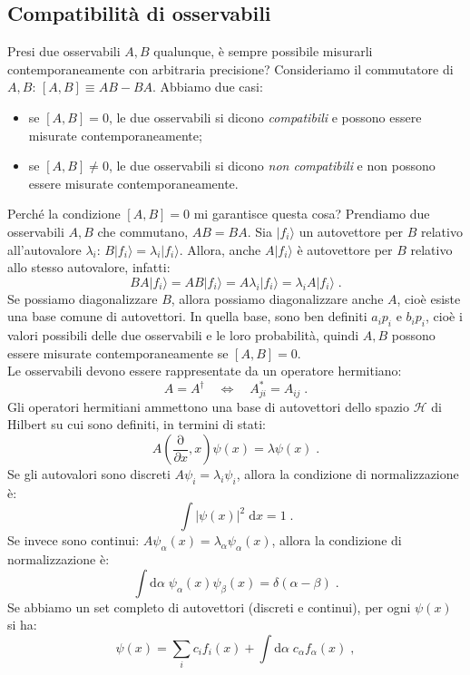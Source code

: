 \documentclass[12pt,a4paper]{report}
\theoremstyle{definition}
\newcommand{\ham}{\mathcal{H}}
\numberwithin{equation}{section}
\newcommand{\diff}[1][]{\mathrm{d}#1}
\newcommand{\ket}{\rangle}
\begin{document}
\subsection{Compatibilità di osservabili}
Presi due osservabili $A,B$ qualunque, è sempre possibile misurarli contemporaneamente con arbitraria precisione? Consideriamo il commutatore di $A,B$: $[A,B]\equiv AB-BA$. Abbiamo due casi:
\begin{itemize}
\item se $[A,B]=0$, le due osservabili si dicono \textit{compatibili} e possono essere misurate contemporaneamente;
\item se $[A,B]\ne0$, le due osservabili si dicono \textit{non compatibili} e non possono essere misurate contemporaneamente.
\end{itemize}
Perché la condizione $[A,B]=0$ mi garantisce questa cosa? Prendiamo due osservabili $A,B$ che commutano, $AB=BA$. Sia $|f_i\ket$ un autovettore per $B$ relativo all'autovalore $\lambda_i$: $B|f_i\ket=\lambda_i |f_i\ket$. Allora, anche $A|f_i\ket$ è autovettore per $B$ relativo allo stesso autovalore, infatti:
$$
BA|f_i\ket=AB|f_i\ket=A\lambda_i|f_i\ket=\lambda_iA|f_i\ket\;.
$$
Se possiamo diagonalizzare $B$, allora possiamo diagonalizzare anche $A$, cioè esiste una base comune di autovettori. In quella base, sono ben definiti $a_ip_i$ e $b_ip_i$, cioè i valori possibili delle due osservabili e le loro probabilità, quindi $A,B$ possono essere misurate contemporaneamente se $[A,B]=0$.
 \\
Le osservabili devono essere rappresentate da un operatore hermitiano: 
$$
A=A^{\dagger}\quad \Longleftrightarrow \quad A_{ji}^*=A_{ij}\;.
$$
Gli operatori hermitiani ammettono una base di autovettori dello spazio $\ham$ di Hilbert su cui sono definiti, in termini di stati:
$$
A\left(\frac{\mathrm{\partial}}{\partial x},x\right)\psi(x)=\lambda\psi(x)\;.
$$
Se gli autovalori sono discreti $A\psi_i=\lambda_i\psi_i$, allora la condizione di normalizzazione è:
\begin{equation}
\int |\psi(x)|^2\;\diff{x}=1\;.
\end{equation}
Se invece sono continui: $A\psi_{\alpha}(x)=\lambda_{\alpha}\psi_{\alpha}(x)$, allora la condizione di normalizzazione è:
\begin{equation}
\int\diff{\alpha}\;\psi_{\alpha}(x)\psi_{\beta}(x)=\delta(\alpha-\beta)\;.
\end{equation}
Se abbiamo un set completo di autovettori (discreti e continui), per ogni $\psi(x)$ si ha:
\begin{equation}
\psi(x)=\sum_i c_i f_i(x)+\int\diff{\alpha}\; c_{\alpha}f_{\alpha}(x)\;, \label{ch2_psisviluppo}
\end{equation}
\end{document}
